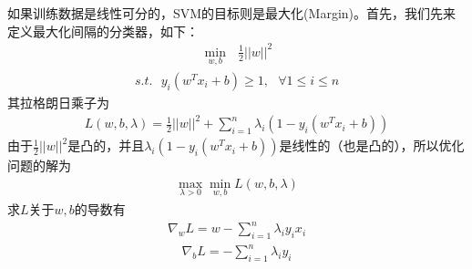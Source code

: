 \documentclass[letterpaper,10pt,english]{sphinxmanual}
\begin{document}
\sphinxAtStartPar
如果训练数据是线性可分的，SVM的目标则是最大化(Margin)。首先，我们先来定义最大化间隔的分类器，如下：
\begin{equation}\label{equation:appendix_machine_learning_introduction/classic_machine_learning:appendix_machine_learning_introduction/classic_machine_learning:0}
\begin{split}\min_{{w},b} ~~~\frac{1}{2} ||{w}||^2\end{split}
\end{equation}\begin{equation}\label{equation:appendix_machine_learning_introduction/classic_machine_learning:appendix_machine_learning_introduction/classic_machine_learning:1}
\begin{split}s.t. ~~~y_i ({w}^T {x_i} + b) \geq 1, ~~~\forall 1 \leq i \leq n\end{split}
\end{equation}
\sphinxAtStartPar
其拉格朗日乘子为
\begin{equation}\label{equation:appendix_machine_learning_introduction/classic_machine_learning:appendix_machine_learning_introduction/classic_machine_learning:2}
\begin{split}L({w},b,{\lambda}) = \frac{1}{2} ||{w}||^2 + \sum_{i=1}^n \lambda_i (1-y_i({w}^T {x_i} + b))\end{split}
\end{equation}
\sphinxAtStartPar
由于\(\frac{1}{2} ||{w}||^2\)是凸的，并且\(\lambda_i (1-y_i({w}^T {x_i} + b))\)是线性的（也是凸的），所以优化问题的解为
\begin{equation}\label{equation:appendix_machine_learning_introduction/classic_machine_learning:appendix_machine_learning_introduction/classic_machine_learning:3}
\begin{split}\max_{\lambda>0} \min_{{w},b} L({w},b, {\lambda})\end{split}
\end{equation}
\sphinxAtStartPar
求\(L\)关于\({w},b\)的导数有
\begin{equation}\label{equation:appendix_machine_learning_introduction/classic_machine_learning:appendix_machine_learning_introduction/classic_machine_learning:4}
\begin{split}\nabla_{{w}} L= {w} - \sum_{i=1}^n \lambda_i y_i {x_i}\end{split}
\end{equation}\begin{equation}\label{equation:appendix_machine_learning_introduction/classic_machine_learning:appendix_machine_learning_introduction/classic_machine_learning:5}
\begin{split}\nabla_b L = - \sum_{i=1}^n \lambda_i y_i\end{split}
\end{equation}
\end{document}
